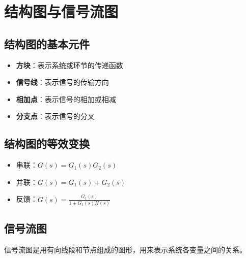 \section{结构图与信号流图}

\subsection{结构图的基本元件}
\begin{itemize}
    \item \textbf{方块}：表示系统或环节的传递函数
    \item \textbf{信号线}：表示信号的传输方向
    \item \textbf{相加点}：表示信号的相加或相减
    \item \textbf{分支点}：表示信号的分叉
\end{itemize}

\subsection{结构图的等效变换}
\begin{itemize}
    \item 串联：$G(s) = G_1(s)G_2(s)$
    \item 并联：$G(s) = G_1(s) + G_2(s)$
    \item 反馈：$G(s) = \frac{G_1(s)}{1 \pm G_1(s)H(s)}$
\end{itemize}

\subsection{信号流图}
信号流图是用有向线段和节点组成的图形，用来表示系统各变量之间的关系。
